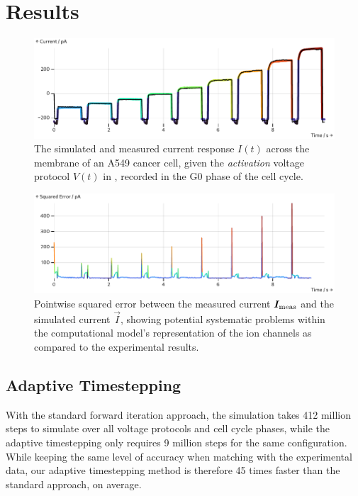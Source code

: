 \documentclass[USenglish,twocolumn]{article}
\begin{document}
  \section{Results}
  \begin{figure}[h]
    \includegraphics[width=\columnwidth]{../figures/results/full-simulation-current.pdf}
    \caption{The simulated and measured current response $I(t)$ across the membrane of an A549 cancer cell, given the \textit{activation} voltage protocol $V(t)$ in , recorded in the G0 phase of the cell cycle.}
    \label{figure:full-simulation-current}
  \end{figure}
  \begin{figure}
    \includegraphics[width=\columnwidth]{../figures/results/simulation-error.pdf}
    \caption{Pointwise squared error between the measured current $\vec{I}_{\rm meas}$ and the simulated current $\vec{I}$, showing potential systematic problems within the computational model's representation of the ion channels as compared to the experimental results.}
    \label{figure:simulation-error}
  \end{figure}

  \subsection{Adaptive Timestepping}
  With the standard forward iteration approach, the simulation takes 412 million steps to simulate over all voltage protocols and cell cycle phases, while the adaptive timestepping only requires 9 million steps for the same configuration.
  While keeping the same level of accuracy when matching with the experimental data, our adaptive timestepping method is therefore 45 times faster than the standard approach, on average.
\end{document}

